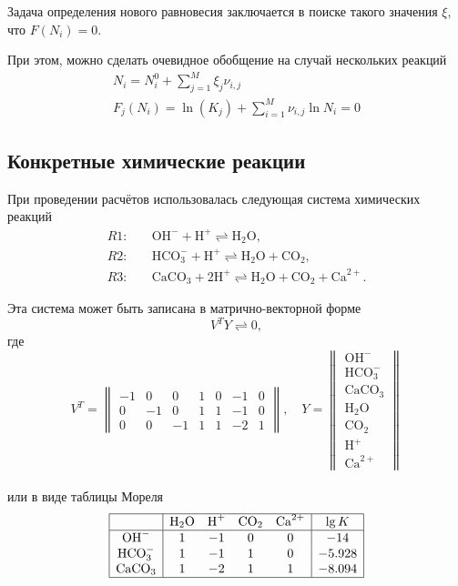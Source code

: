 \documentclass[14pt,a4paper]{extarticle}
\begin{document}
Задача определения нового равновесия заключается в поиске такого значения $\xi$, что $F(N_i) = 0$.

 При этом, можно сделать очевидное обобщение на случай нескольких реакций
\begin{gather*}
N_i = N_i^0 + \sum_{j=1}^{M} \xi_j\nu_{i,j}\\
F_j(N_i)=\ln(K_j) + \sum_{i=1}^{M} \nu_{i,j}\ln{N_i} = 0
\end{gather*}
 
\subsection{Конкретные химические реакции}

\newcommand{\OHm}{\text{OH}^-}
\newcommand{\Hp}{\text{H}^+}
\newcommand{\WAT}{\text{H}_2\text{O}}
\newcommand{\CARB}{\text{CO}_2}
\newcommand{\Catwop}{\text{Ca}^{2+}}
\newcommand{\Calcite}{\text{CaCO}_3}
\newcommand{\HCO}{\text{HCO}_3^{-}}
При проведении расчётов использовалась следующая система химических реакций
\begin{align*}
R1:&\quad \OHm + \Hp \rightleftharpoons \WAT,\\
R2:&\quad \HCO +\Hp \rightleftharpoons \WAT + \CARB,\\
R3:&\quad \Calcite + 2\Hp \rightleftharpoons \WAT + \CARB + \Catwop.
\end{align*}

Эта  система может быть записана в матрично-векторной форме $$V^T Y \rightleftharpoons 0,$$ где
$$V^T =  \begin{Vmatrix}
-1 &0 &0  &1 &0 &-1 &0\\
0 &-1 &0  &1 &1 &-1 &0\\
0  &0 &-1  &1 &1 &-2 &1
		\end{Vmatrix}, \quad
  Y = \begin{Vmatrix}
  \OHm\\
  \HCO\\
  \Calcite\\
  \WAT\\
  \CARB\\
  \Hp\\
  \Catwop
  \end{Vmatrix}$$\\
или в виде таблицы Мореля\\
$$\begin{array}{|c|cccc|c|}
\hline
		&\WAT	&\Hp	&\CARB	&\Catwop	&\lg {K}\\
\hline
\OHm		&1		&-1		&0		  &0		&-14\\
\HCO	&1		&-1		&1		  &0		&-5.928\\
\Calcite		&1		&-2		&1		  &1		&-8.094\\
\hline
\end{array}$$
\end{document}
